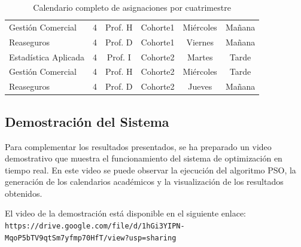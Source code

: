 \begin{table}[htbp]
\begin{tabular}{|p{3cm}|c|c|c|c|c|}
Gestión Comercial & 4 & Prof. H & Cohorte1 & Miércoles & Mañana \\
Reaseguros & 4 & Prof. D & Cohorte1 & Viernes & Mañana \\
Estadística Aplicada & 4 & Prof. I & Cohorte2 & Martes & Tarde \\
Gestión Comercial & 4 & Prof. H & Cohorte2 & Miércoles & Tarde \\
Reaseguros & 4 & Prof. D & Cohorte2 & Jueves & Mañana \\
\hline
\end{tabular}
\caption{Calendario completo de asignaciones por cuatrimestre}
\label{tab:calendario_completo}
\end{table}

\subsection{Demostración del Sistema}

Para complementar los resultados presentados, se ha preparado un video demostrativo que muestra el funcionamiento del sistema de optimización en tiempo real. En este video se puede observar la ejecución del algoritmo PSO, la generación de los calendarios académicos y la visualización de los resultados obtenidos.

El video de la demostración está disponible en el siguiente enlace:
\\[2em]
\texttt{https://drive.google.com/file/d/1hGi3YIPN-MqoP5bTV9qtSm7yfmp70HfT/view?usp=sharing}

